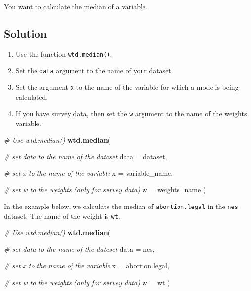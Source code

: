 \documentclass[
]{book}
\newenvironment{Shaded}{\begin{snugshade}}{\end{snugshade}}
\newcommand{\AttributeTok}[1]{\textcolor[rgb]{0.13,0.29,0.53}{#1}}
\newcommand{\CommentTok}[1]{\textcolor[rgb]{0.56,0.35,0.01}{\textit{#1}}}
\newcommand{\FunctionTok}[1]{\textcolor[rgb]{0.13,0.29,0.53}{\textbf{#1}}}
\newcommand{\NormalTok}[1]{#1}
\providecommand{\tightlist}{%
  \setlength{\itemsep}{0pt}\setlength{\parskip}{0pt}}
\begin{document}
You want to calculate the median of a variable.

\hypertarget{solution-31}{%
\subsection{Solution}\label{solution-31}}

\begin{enumerate}
\def\labelenumi{\arabic{enumi}.}
\tightlist
\item
  Use the function \texttt{wtd.median()}.
\item
  Set the \texttt{data} argument to the name of your dataset.
\item
  Set the argument \texttt{x} to the name of the variable for which a mode is being calculated.
\item
  If you have survey data, then set the \texttt{w} argument to the name of the weights variable.
\end{enumerate}

\begin{Shaded}
\begin{Highlighting}[]
\CommentTok{\# Use \textasciigrave{}wtd.median()\textasciigrave{}}
\FunctionTok{wtd.median}\NormalTok{(}
  
  \CommentTok{\# set data to the name of the dataset}
  \AttributeTok{data =}\NormalTok{ dataset,}
  
  \CommentTok{\# set x to the name of the variable}
  \AttributeTok{x =}\NormalTok{ variable\_name,}
  
  \CommentTok{\# set w to the weights (only for survey data)}
  \AttributeTok{w =}\NormalTok{ weights\_name}
\NormalTok{)}
\end{Highlighting}
\end{Shaded}

In the example below, we calculate the median of \texttt{abortion.legal} in the \texttt{nes} dataset. The name of the weight is \texttt{wt}.

\begin{Shaded}
\begin{Highlighting}[]
\CommentTok{\# Use \textasciigrave{}wtd.median()\textasciigrave{}}
\FunctionTok{wtd.median}\NormalTok{(}
  
  \CommentTok{\# set data to the name of the dataset}
  \AttributeTok{data =}\NormalTok{ nes,}
  
  \CommentTok{\# set x to the name of the variable}
  \AttributeTok{x =}\NormalTok{ abortion.legal,}
  
  \CommentTok{\# set w to the weights (only for survey data)}
  \AttributeTok{w =}\NormalTok{ wt}
\NormalTok{)}
\end{Highlighting}
\end{Shaded}
\end{document}
